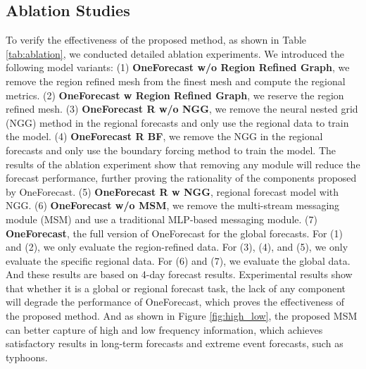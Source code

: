 \subsection{Ablation Studies}
    To verify the effectiveness of the proposed method, as shown in Table \ref{tab:ablation}, we conducted detailed ablation experiments. We introduced the following model variants: (1) \textbf {OneForecast w/o Region Refined Graph}, we remove the region refined mesh from the finest mesh and compute the regional metrics. (2) \textbf {OneForecast w Region Refined Graph}, we reserve the region refined mesh. (3) \textbf {OneForecast R w/o NGG}, we remove the neural nested grid (NGG) method in the regional forecasts and only use the regional data to train the model. (4) \textbf {OneForecast R BF}, we remove the NGG in the regional forecasts and only use the boundary forcing method to train the model. The results of the ablation experiment show that removing any module will reduce the forecast performance, further proving the rationality of the components proposed by OneForecast. (5) \textbf {OneForecast R w NGG}, regional forecast model with NGG. (6) \textbf {OneForecast w/o MSM}, we remove the multi-stream messaging module (MSM) and use a traditional MLP-based messaging module. (7) \textbf {OneForecast}, the full version of OneForecast for the global forecasts. For (1) and (2), we only evaluate the region-refined data. For (3), (4), and (5), we only evaluate the specific regional data. For (6) and (7), we evaluate the global data. And these results are based on 4-day forecast results. Experimental results show that whether it is a global or regional forecast task, the lack of any component will degrade the performance of OneForecast, which proves the effectiveness of the proposed method. And as shown in Figure \ref{fig:high_low}, the proposed MSM can better capture of high and low frequency information, which achieves satisfactory results in long-term forecasts and extreme event forecasts, such as typhoons.

